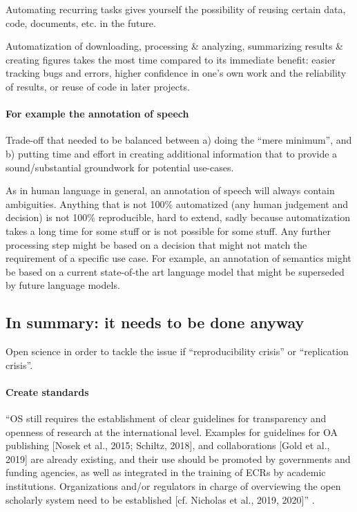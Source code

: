 Automating recurring tasks gives yourself the possibility of reusing
certain data, code, documents, etc. in the future.

%
Automatization of downloading, processing \& analyzing, summarizing
results \& creating figures takes the most time compared to its immediate
benefit:
%
easier tracking bugs and errors, higher confidence in one's own work and the
reliability of results, or reuse of code in later projects.



\paragraph{For example the annotation of speech}


Trade-off that needed to be balanced between
%
a) doing the ``mere minimum'', and
%
b) putting time and effort in creating additional information that to provide a
sound/substantial groundwork for potential use-cases.

%
As in human language in general, an annotation of speech will always contain
ambiguities.
%
Anything that is not 100\% automatized (any human judgement and decision) is not
100\% reproducible, hard to extend, sadly because automatization takes a long
time for some stuff or is not possible for some stuff.
%
Any further processing step might be based on a decision that might not match
the requirement of a specific use case.
%
For example, an annotation of semantics might be based on a current state-of-the
art language model that might be superseded by future language models.




\subsection{In summary: it needs to be done anyway}

%
Open science in order to tackle the issue if ``reproducibility crisis'' or
``replication crisis''.


\paragraph{Create standards}


%
``OS still requires the establishment of clear guidelines for transparency and
openness of research at the international level.
%
Examples for guidelines for OA publishing [Nosek et al., 2015; Schiltz, 2018],
and collaborations [Gold et al., 2019] are already existing, and their use
should be promoted by governments and funding agencies, as well as integrated in
the training of ECRs by academic institutions.
%
Organizations and/or regulators in charge of overviewing the open scholarly
system need to be established [cf. Nicholas et al., 2019, 2020]''
\citep{toribio2021early}.


